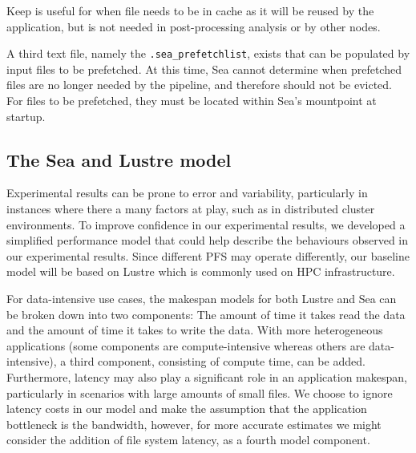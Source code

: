 \documentclass[10pt,journal,compsoc]{IEEEtran}
\begin{document}
Keep is useful for when file needs to be in cache as it will be reused by the
application, but is not needed in post-processing analysis or by other nodes.

A third text file, namely the \texttt{.sea\_prefetchlist}, exists that can be populated by input
files to be prefetched. At this time, Sea cannot determine when prefetched files are no longer needed by the pipeline, and
therefore should not be evicted. For files to be prefetched, they must be located within Sea's mountpoint at startup.


\subsection{The Sea and Lustre model}\label{ss:sea-comp:model}

      Experimental results can be prone to error and variability, particularly
      in instances where there a many factors at play, such as in distributed cluster
      environments. To improve confidence in our experimental results, we developed a
      simplified performance model that could help describe the behaviours observed in our experimental
      results. Since different PFS may
      operate differently, our baseline model will be based on Lustre which is
      commonly used on HPC infrastructure.

      For data-intensive use cases, the makespan models for both Lustre and Sea
      can be broken down into two components: The amount of time it takes read
      the data and the amount of time it takes to write the data. With more
      heterogeneous applications (some components are compute-intensive whereas
      others are data-intensive), a third component, consisting of compute time,
      can be added. Furthermore, latency may also play a significant role in an
      application makespan, particularly in scenarios with large amounts of
      small files. We choose to ignore latency costs in our model and make the
      assumption that the application bottleneck is the bandwidth, however, for
      more accurate estimates we might consider the addition of file system
      latency, as a fourth model component.
\end{document}
